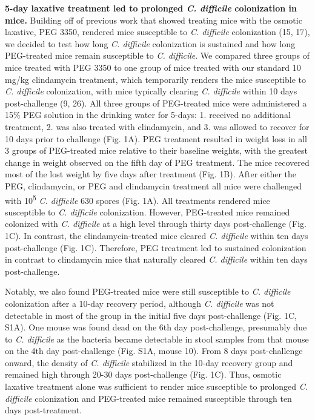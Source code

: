 \documentclass[
  11pt,
]{article}
\begin{document}
\textbf{5-day laxative treatment led to prolonged \emph{C. difficile}
colonization in mice.} Building off of previous work that showed
treating mice with the osmotic laxative, PEG 3350, rendered mice
susceptible to \emph{C. difficile} colonization (15, 17), we decided to
test how long \emph{C. difficile} colonization is sustained and how long
PEG-treated mice remain susceptible to \emph{C. difficile}. We compared
three groups of mice treated with PEG 3350 to one group of mice treated
with our standard 10 mg/kg clindamycin treatment, which temporarily
renders the mice susceptible to \emph{C. difficile} colonization, with
mice typically clearing \emph{C. difficile} within 10 days
post-challenge (9, 26). All three groups of PEG-treated mice were
administered a 15\% PEG solution in the drinking water for 5-days: 1.
received no additional treatment, 2. was also treated with clindamycin,
and 3. was allowed to recover for 10 days prior to challenge (Fig. 1A).
PEG treatment resulted in weight loss in all 3 groups of PEG-treated
mice relative to their baseline weights, with the greatest change in
weight observed on the fifth day of PEG treatment. The mice recovered
most of the lost weight by five days after treatment (Fig. 1B). After
either the PEG, clindamycin, or PEG and clindamycin treatment all mice
were challenged with 10\textsuperscript{5} \emph{C. difficile} 630
spores (Fig. 1A). All treatments rendered mice susceptible to \emph{C.
difficile} colonization. However, PEG-treated mice remained colonized
with \emph{C. difficile} at a high level through thirty days
post-challenge (Fig. 1C). In contrast, the clindamycin-treated mice
cleared \emph{C. difficile} within ten days post-challenge (Fig. 1C).
Therefore, PEG treatment led to sustained colonization in contrast to
clindamycin mice that naturally cleared \emph{C. difficile} within ten
days post-challenge.

Notably, we also found PEG-treated mice were still susceptible to
\emph{C. difficile} colonization after a 10-day recovery period,
although \emph{C. difficile} was not detectable in most of the group in
the initial five days post-challenge (Fig. 1C, S1A). One mouse was found
dead on the 6th day post-challenge, presumably due to \emph{C.
difficile} as the bacteria became detectable in stool samples from that
mouse on the 4th day post-challenge (Fig. S1A, mouse 10). From 8 days
post-challenge onward, the density of \emph{C. difficile} stabilized in
the 10-day recovery group and remained high through 20-30 days
post-challenge (Fig. 1C). Thus, osmotic laxative treatment alone was
sufficient to render mice susceptible to prolonged \emph{C. difficile}
colonization and PEG-treated mice remained susceptible through ten days
post-treatment.
\end{document}
